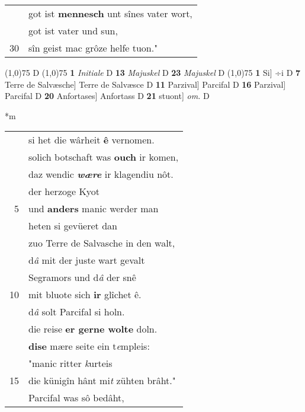 \documentclass[8pt,a4paper,notitlepage]{article}
\begin{document}
\begin{table}[ht]
\begin{minipage}[t]{0.5\linewidth}
\begin{tabular}{rl}
 & got ist \textbf{mennesch} unt sînes vater wort,\\ 
 & got ist vater und sun,\\ 
30 & sîn geist mac grôze helfe tuon."\\ 
\end{tabular}
\scriptsize
\line(1,0){75} \newline
D \newline
\line(1,0){75} \newline
\textbf{1} \textit{Initiale} D  \textbf{13} \textit{Majuskel} D  \textbf{23} \textit{Majuskel} D  \newline
\line(1,0){75} \newline
\textbf{1} Si] ÷i D \textbf{7} Terre de Salvæsche] Terre de Salvæsce D \textbf{11} Parzival] Parcifal D \textbf{16} Parzival] Parcifal D \textbf{20} Anfortases] Anfortass D \textbf{21} stuont] \textit{om.} D \newline
\end{minipage}
\hspace{0.5cm}
\begin{minipage}[t]{0.5\linewidth}
\small
\begin{center}*m
\end{center}
\begin{tabular}{rl}
 & si het die wârheit \textbf{ê} vernomen.\\ 
 & solich botschaft was \textbf{ouch} ir komen,\\ 
 & daz wendic \textit{\textbf{wære}} ir klagendiu nôt.\\ 
 & der herzoge Kyot\\ 
5 & und \textbf{anders} manic werder man\\ 
 & heten si gevüeret dan\\ 
 & zuo Terre de Salvasche in den walt,\\ 
 & d\textit{â} mit der juste wart gevalt\\ 
 & Segramors und d\textit{â} der snê\\ 
10 & mit bluote sich \textbf{ir} glîchet ê.\\ 
 & d\textit{â} solt Parcifal si holn.\\ 
 & die reise \textbf{er gerne wolte} doln.\\ 
 & \textbf{dise} mære seite ein t\textit{e}mpleis:\\ 
 & "manic ritter \textit{k}urteis\\ 
15 & die künigîn hânt mi\textit{t} zühten brâht."\\ 
 & Parcifal was sô bedâht,\\ 

\end{tabular}
\end{minipage}
\end{table}
\end{document}
